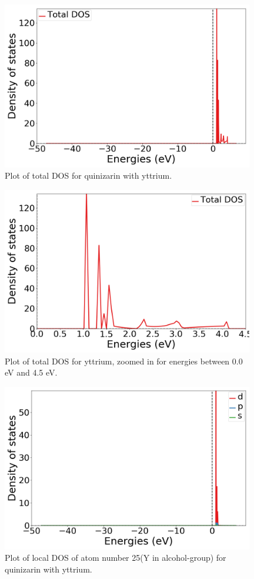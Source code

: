 \documentclass{article}
\begin{document}
  \begin{figure}[H]
      \centering
      \includegraphics[width = 11cm]{../fig/Y_k4_TDOS_1.png}
      \caption{Plot of total DOS for quinizarin with yttrium. }
      \label{fig:Y_k4_TDOS_1.png}
  \end{figure}

  \begin{figure}[H]
      \centering
      \includegraphics[width = 11cm]{../fig/Y_k4_TDOS_2.png}
      \caption{Plot of total DOS for yttrium, zoomed in for energies between 0.0 eV and 4.5 eV. }
      \label{fig:Y_k4_TDOS_2.png}
  \end{figure}

  \begin{figure}[H]
      \centering
      \includegraphics[width = 11cm]{../fig/Y_k4_LDOS25_1.png}
      \caption{Plot of local DOS of atom number 25(Y in alcohol-group) for quinizarin with yttrium. }
      \label{fig:Y_k4_LDOS25_1.png}
  \end{figure}
\end{document}
